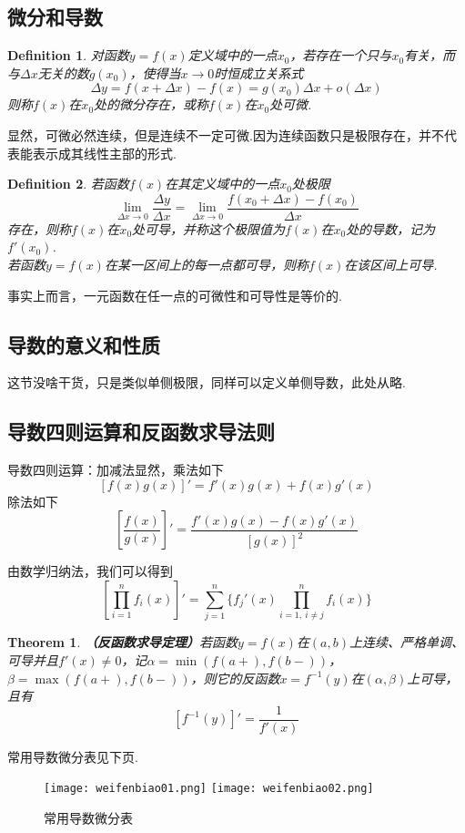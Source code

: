 \documentclass[9pt]{ctexart}
\newtheorem{definition}{Definition}[section]
\newtheorem{theorem}{Theorem}[section]
\begin{document}
\subsection{微分和导数}
\begin{definition}
    对函数$y=f(x)$定义域中的一点$x_0$，若存在一个只与$x_0$有关，而与$\Delta x$无关的数$g(x_0)$，使得当$x\to 0$时恒成立关系式
    \[\Delta y=f(x+\Delta x)-f(x)=g(x_0)\Delta x+o(\Delta x)\]
    则称$f(x)$在$x_0$处的微分存在，或称$f(x)$在$x_0$处可微.
\end{definition}
\par{显然，可微必然连续，但是连续不一定可微.因为连续函数只是极限存在，并不代表能表示成其线性主部的形式.}
\begin{definition}
    若函数$f(x)$在其定义域中的一点$x_0$处极限
    \[\lim_{\Delta x\to 0}\frac{\Delta y}{\Delta x}=\lim_{\Delta x\to 0}\frac{f(x_0+\Delta x)-f(x_0)}{\Delta x}\]
    存在，则称$f(x)$在$x_0$处可导，并称这个极限值为$f(x)$在$x_0$处的导数，记为$f'(x_0)$.\\
    若函数$y=f(x)$在某一区间上的每一点都可导，则称$f(x)$在该区间上可导.
\end{definition}
\par{事实上而言，一元函数在任一点的可微性和可导性是等价的.}
\subsection{导数的意义和性质}
\par{这节没啥干货，只是类似单侧极限，同样可以定义单侧导数，此处从略.}
\subsection{导数四则运算和反函数求导法则}
\par{导数四则运算：加减法显然，乘法如下
\[[f(x)g(x)]'=f'(x)g(x)+f(x)g'(x)\]
除法如下
\[[\frac{f(x)}{g(x)}]'=\frac{f'(x)g(x)-f(x)g'(x)}{[g(x)]^2}\]
}
\par{由数学归纳法，我们可以得到
\[[\prod_{i=1}^n f_i(x)]'=\sum_{j=1}^{n}\{f_j'(x)\prod_{i=1,\ i\neq j}^nf_i(x)\}\]}
\begin{theorem}
    \textbf{（反函数求导定理）}若函数$y=f(x)$在$(a,b)$上连续、严格单调、可导并且$f'(x)\neq 0$，记$\alpha=\min(f(a+),f(b-))$，$\beta=\max(f(a+),f(b-))$，则它的反函数$x=f^{-1}(y)$在$(\alpha,\beta)$上可导，且有
    \[[f^{-1}(y)]'=\frac{1}{f'(x)}\]
\end{theorem}
\par{常用导数微分表见下页.}
\begin{figure}[htbp]
    \centering
    \texttt{[image: weifenbiao01.png]}
    \texttt{[image: weifenbiao02.png]}
    \caption{常用导数微分表}
\end{figure}
\newpage
\end{document}
